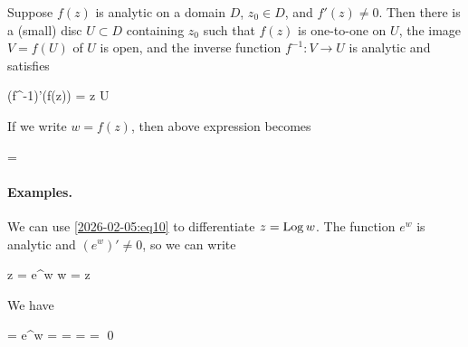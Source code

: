 \begin{theorem}
    Suppose $f(z)$ is analytic on a domain $D$, $z_0 \in D$, and $f'(z) \neq 0$. Then there is a (small) disc $U \subset D$ containing $z_0$ such that $f(z)$ is one-to-one on $U$, the image $V = f(U)$ of $U$ is open, and the inverse function $f^{-1}: V \rightarrow U$ is analytic and satisfies

    \bee
        (f^{-1})'(f(z)) =  \quad z \in U
    \eee
\end{theorem}

If we write $w = f(z)$, then above expression becomes

\be\label{2026-02-05:eq10}
 = 
\ee

\paragraph{Examples.} We can use \eqref{2026-02-05:eq10} to differentiate $z = \operatorname{Log} w$. The function $e^w$ is analytic and $(e^w)' \neq 0$, so we can write

\bee
z = e^w \rightarrow w = \Log z
\eee

We have

\bee
{} = e^w \rightarrow {} =  =  =  =  \qed
\eee


